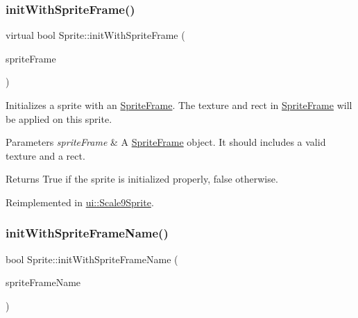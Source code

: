 \subsubsection{\texorpdfstring{init\+With\+Sprite\+Frame()}{initWithSpriteFrame()}\hspace{0.1cm}{\footnotesize\ttfamily [2/2]}}
{\footnotesize\ttfamily virtual bool Sprite\+::init\+With\+Sprite\+Frame (\begin{DoxyParamCaption}\item[{\hyperlink{classSpriteFrame}{Sprite\+Frame} $\ast$}]{sprite\+Frame }\end{DoxyParamCaption})\hspace{0.3cm}{\ttfamily [virtual]}}

Initializes a sprite with an \hyperlink{classSpriteFrame}{Sprite\+Frame}. The texture and rect in \hyperlink{classSpriteFrame}{Sprite\+Frame} will be applied on this sprite.


\begin{DoxyParams}{Parameters}
{\em sprite\+Frame} & A \hyperlink{classSpriteFrame}{Sprite\+Frame} object. It should includes a valid texture and a rect. \\
\hline
\end{DoxyParams}
\begin{DoxyReturn}{Returns}
True if the sprite is initialized properly, false otherwise. 
\end{DoxyReturn}


Reimplemented in \hyperlink{classui_1_1Scale9Sprite_a77f0c229307f987be75ebad959cb2b18}{ui\+::\+Scale9\+Sprite}.

\mbox{\label{classSprite_ab30fa40d8c557779a21a2a941c3f18ea}} 
\subsubsection{\texorpdfstring{init\+With\+Sprite\+Frame\+Name()}{initWithSpriteFrameName()}\hspace{0.1cm}{\footnotesize\ttfamily [1/2]}}
{\footnotesize\ttfamily bool Sprite\+::init\+With\+Sprite\+Frame\+Name (\begin{DoxyParamCaption}\item[{const std\+::string \&}]{sprite\+Frame\+Name }\end{DoxyParamCaption})\hspace{0.3cm}{\ttfamily [virtual]}}

